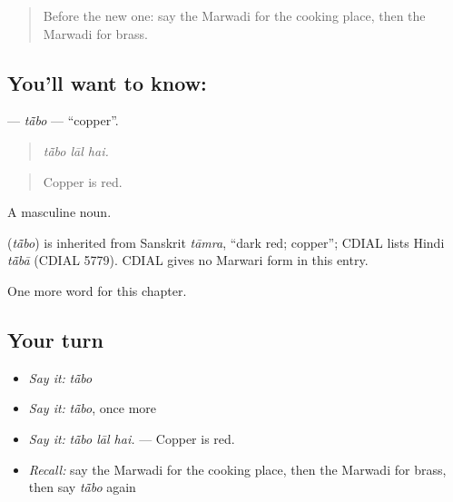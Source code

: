 \label{lesson:MW-C184-tabo}



\begin{quote}
Before the new one: say the Marwadi for the cooking place, then the Marwadi for brass.
\end{quote}

\subsection*{You'll want to know: }
\textbf{} — \emph{tā̃bo} — \textquotedblleft{}copper\textquotedblright{}.

\begin{quote}
  
\end{quote}

\begin{quote}
\emph{tā̃bo lāl hai.}
\end{quote}

\begin{quote}
Copper is red.
\end{quote}

A masculine noun.

\begin{cousinweb}
\textbf{} (\emph{tā̃bo}) is inherited from Sanskrit \emph{tāmra}, \textquotedblleft{}dark red; copper\textquotedblright{}; CDIAL lists Hindi \emph{tā̃bā} (CDIAL 5779). CDIAL gives no Marwari form in this entry.
\end{cousinweb}

\begin{grammarlens}[title={What you've built}]
One more word for this chapter.
\end{grammarlens}

\subsection*{Your turn}
\begin{itemize}
\raggedright
  \item \emph{Say it:} \emph{tā̃bo}
  \item \emph{Say it:} \emph{tā̃bo}, once more
  \item \emph{Say it:} \emph{tā̃bo lāl hai.} — Copper is red.
  \item \emph{Recall:} say the Marwadi for the cooking place, then the Marwadi for brass, then say \emph{tā̃bo} again
\end{itemize}


